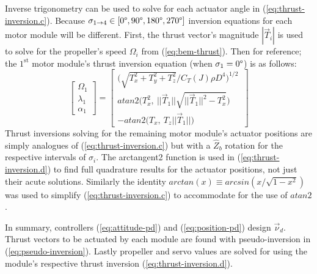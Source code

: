 \documentclass[a4paper, 10pt, conference]{ieeeconf}
\begin{document}
Inverse trigonometry can be used to solve for each actuator angle in (\ref{eq:thrust-inversion.c}). Because $\sigma_{1\rightarrow 4}\in[0\text{\textdegree},90\text{\textdegree},180\text{\textdegree},270\text{\textdegree}]$ inversion equations for each motor module will be different. First, the thrust vector's magnitude $|\vec{T}_i|$ is used to solve for the propeller's speed $\Omega_i$ from (\ref{eq:bem-thrust}). Then for reference; the $1^{\text{st}}$ motor module's thrust inversion equation (when $\sigma_1=0\text{\textdegree}$) is as follows:
\begin{equation}\label{eq:thrust-inversion.d}
\begin{bmatrix}
\Omega_1\\
\lambda_1\\
\alpha_1
\end{bmatrix}=\begin{bmatrix}
\Big(\sqrt{T_x^2+T_y^2+T_z^2}/C_T(J)\rho D^4\Big)^{1/2}\hspace{2pt}\\
atan2\Big(T_x^2,~||\vec{T}_1||\sqrt{||\vec{T}_1||^2-T_x^2}\text{}\Big)\\
-atan2\Big(T_x,~T_z||\vec{T}_1||\Big)
\end{bmatrix}
\end{equation}
Thrust inversions solving for the remaining motor module's actuator positions are simply analogues of (\ref{eq:thrust-inversion.c}) but with a $\hat{Z}_b$ rotation for the respective intervals of $\sigma_i$. The arctangent2 function is used in (\ref{eq:thrust-inversion.d}) to find full quadrature results for the actuator positions, not just their acute solutions. Similarly the identity $arctan(x)\equiv arcsin(x/\sqrt{1-x^2})$ was used to simplify (\ref{eq:thrust-inversion.c}) to accommodate for the use of $atan2$.
\par
In summary, controllers (\ref{eq:attitude-pd}) and (\ref{eq:position-pd}) design $\vec{\nu}_d$. Thrust vectors to be actuated by each module are found with pseudo-inversion in (\ref{eq:pseudo-inversion}). Lastly propeller and servo values are solved for using the module's respective thrust inversion (\ref{eq:thrust-inversion.d}).
\end{document}
